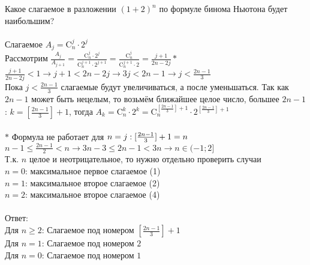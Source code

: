 \documentclass{article}
\begin{document}
\section{}
Какое слагаемое в разложении $(1+2)^n$ по формуле бинома Ньютона будет наибольшим?\\\\
Слагаемое $A_j = \text{C}^j_n \cdot 2^j$\\
Рассмотрим $\frac{A_j}{A_{j+1}}=\frac{\text{C}^j_n \cdot 2^j}{\text{C}^{j+1}_n \cdot 2^{j+1}}=\frac{\text{C}^j_n}{\text{C}^{j+1}_n \cdot 2}=\frac{j+1}{2n-2j}\ast$\\
$\frac{j+1}{2n-2j} < 1 \rightarrow j+1 < 2n - 2j \rightarrow 3j < 2n - 1 \rightarrow j < \frac{2n-1}{3}$\\
Пока $j < \frac{2n-1}{3}$ слагаемые будут увеличиваться, а после уменьшаться.
Так как $2n-1$ может быть нецелым, то возьмём ближайшее целое число, большее $2n-1$: $k = [\frac{2n-1}{3}]+1$, тогда $A_k = \text{C}^k_n \cdot 2^k = \text{C}^{[\frac{2n-1}{3}]+1}_n \cdot 2^{[\frac{2n-1}{3}]+1}$
\\\\
$\ast$ Формула не работает для $n=j: [\frac{2n-1}{3}]+1 = n\\$
$n-1\leq\frac{2n-1}{2}<n \rightarrow 3n-3\leq2n-1<3n \rightarrow n \in (-1;2]$\\
Т.к. $n$ целое и неотрицательное, то нужно отдельно проверить случаи\\
$n=0$: максимальное первое слагаемое (1)\\
$n=1$: максимальное второе слагаемое (2)\\
$n=2$: максимальное второе слагаемое (4)
\\\\Ответ: \\
Для $n\geq2$: Слагаемое под номером $[\frac{2n-1}{3}]+1$\\
Для $n=1$: Слагаемое под номером $2$\\
Для $n=0$: Слагаемое под номером $1$
\end{document}
